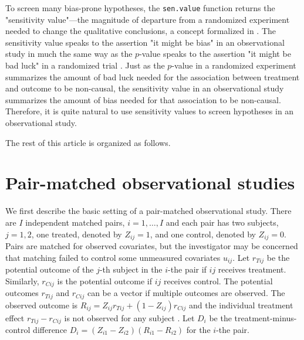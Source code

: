 \documentclass[11pt]{article}\usepackage[]{graphicx}\usepackage[]{color}
\begin{document}
To screen many bias-prone hypotheses, the \texttt{sen.value} function returns the "sensitivity value"---the magnitude of departure from a randomized experiment needed to change the qualitative conclusions, a concept formalized in \citet{zhao2017sensitivity}. The sensitivity value speaks to the assertion "it might be bias" in an observational study in much the same way as the $p$-value speaks to the assertion "it might be bad luck" in a randomized trial \citep{rosenbaum2015two}. Just as the $p$-value in a randomized experiment summarizes the amount of bad luck needed for the association between treatment and outcome to be non-causal, the sensitivity value in an observational study summarizes the amount of bias needed for that association to be non-causal. Therefore, it is quite natural to use sensitivity values to screen hypotheses in an observational study.

The rest of this article is organized as follows.

\section{Pair-matched observational studies}
\label{sec:obs-study}

We first describe the basic setting of a pair-matched observational study. There are $I$ independent matched pairs, $i=1,\dotsc,I$ and each pair has two subjects, $j=1,2$, one treated, denoted by $Z_{ij} = 1$, and one control, denoted by $Z_{ij} = 0$. Pairs are matched for observed covariates, but the investigator may be concerned that matching failed to control some unmeasured covariates $u_{ij}$. Let $r_{Tij}$ be the potential outcome of the $j$-th subject in the $i$-the pair if $ij$ receives treatment. Similarly, $r_{Cij}$ is the potential outcome if $ij$ receives control. The potential outcomes $r_{Tij}$ and $r_{Cij}$ can be a vector if multiple outcomes are observed. The observed outcome is $R_{ij} = Z_{ij} r_{Tij} + (1 - Z_{ij}) r_{Cij}$ and the individual treatment effect $r_{Tij} - r_{Cij}$ is not observed for any subject \citep{rubin1974estimating}.  Let $D_i$ be the treatment-minus-control difference $D_i = (Z_{i1} - Z_{i2})(R_{i1} - R_{i2})$ for the $i$-the pair. 
\end{document}
